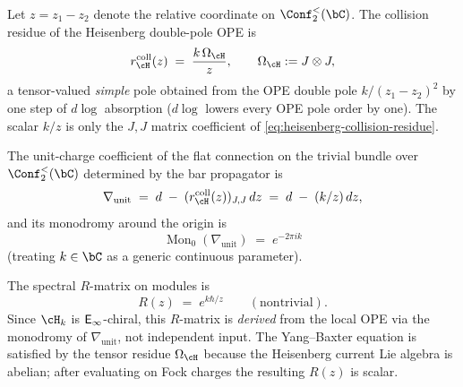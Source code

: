 \begin{theorem}
\label{thm:heisenberg-rmatrix}
Let $z=z_1-z_2$ denote the relative coordinate on
$\Conf_2^{<}(\bC)$. The collision residue of the Heisenberg
double-pole OPE is
\begin{equation}\label{eq:heisenberg-collision-residue}
r^{\mathrm{coll}}_{\cH}(z)
\;=\;
\frac{k\,\Omega_{\cH}}{z},
\qquad
\Omega_{\cH}:=J\otimes J,
\end{equation}
a tensor-valued \emph{simple} pole obtained from the OPE double pole
$k/(z_1-z_2)^2$ by one step of $d\log$ absorption ($d\log$ lowers every OPE pole
order by one). The scalar $k/z$ is only the $J,J$ matrix coefficient of
\eqref{eq:heisenberg-collision-residue}.

The unit-charge coefficient of the flat connection on the trivial bundle over
$\Conf_2^{<}(\bC)$ determined by the bar propagator is
\begin{equation}\label{eq:heisenberg-connection}
\nabla_{\mathrm{unit}} \;=\; d \;-\; (r^{\mathrm{coll}}_{\cH}(z))_{J,J}\,dz
\;=\; d \;-\; (k/z)\,dz,
\end{equation}
and its monodromy around the origin is
\begin{equation}\label{eq:heisenberg-monodromy}
\operatorname{Mon}_0(\nabla_{\mathrm{unit}}) \;=\; e^{-2\pi ik}
\end{equation}
(treating $k\in\bC$ as a generic continuous parameter).

The spectral $R$-matrix on modules is
\begin{equation}\label{eq:heisenberg-R-matrix}
R(z) \;=\; e^{k\hbar/z}
\qquad (\text{nontrivial}).
\end{equation}
Since $\cH_k$ is $\mathsf{E}_{\infty}$-chiral, this $R$-matrix is
\emph{derived} from the local OPE via the monodromy of
$\nabla_{\mathrm{unit}}$, not independent input. The Yang--Baxter
equation is satisfied by the tensor residue $\Omega_{\cH}$ because the
Heisenberg current Lie algebra is abelian; after evaluating on Fock
charges the resulting $R(z)$ is scalar.
\end{theorem}

